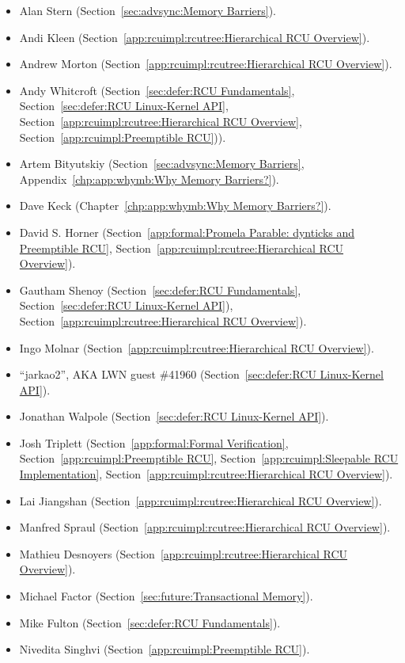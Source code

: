 \begin{itemize}
\item	Alan Stern (Section~\ref{sec:advsync:Memory Barriers}).
\item	Andi Kleen (Section~\ref{app:rcuimpl:rcutree:Hierarchical RCU Overview}).
\item	Andrew Morton (Section~\ref{app:rcuimpl:rcutree:Hierarchical RCU Overview}).
\item	Andy Whitcroft (Section~\ref{sec:defer:RCU Fundamentals},
	Section~\ref{sec:defer:RCU Linux-Kernel API},
	Section~\ref{app:rcuimpl:rcutree:Hierarchical RCU Overview},
	Section~\ref{app:rcuimpl:Preemptible RCU})).
\item	Artem Bityutskiy (Section~\ref{sec:advsync:Memory Barriers},
	Appendix~\ref{chp:app:whymb:Why Memory Barriers?}).
\item	Dave Keck (Chapter~\ref{chp:app:whymb:Why Memory Barriers?}).
\item	David S. Horner
	(Section~\ref{app:formal:Promela Parable: dynticks and Preemptible RCU},
	Section~\ref{app:rcuimpl:rcutree:Hierarchical RCU Overview}).
\item	Gautham Shenoy (Section~\ref{sec:defer:RCU Fundamentals},
	Section~\ref{sec:defer:RCU Linux-Kernel API}),
	Section~\ref{app:rcuimpl:rcutree:Hierarchical RCU Overview}).
\item	Ingo Molnar (Section~\ref{app:rcuimpl:rcutree:Hierarchical RCU Overview}).
\item	``jarkao2'', AKA LWN guest \#41960 (Section~\ref{sec:defer:RCU Linux-Kernel API}).
\item	Jonathan Walpole (Section~\ref{sec:defer:RCU Linux-Kernel API}).
\item	Josh Triplett
	(Section~\ref{app:formal:Formal Verification},
	Section~\ref{app:rcuimpl:Preemptible RCU},
	Section~\ref{app:rcuimpl:Sleepable RCU Implementation},
	Section~\ref{app:rcuimpl:rcutree:Hierarchical RCU Overview}).
\item	Lai Jiangshan (Section~\ref{app:rcuimpl:rcutree:Hierarchical RCU Overview}).
\item	Manfred Spraul (Section~\ref{app:rcuimpl:rcutree:Hierarchical RCU Overview}).
\item	Mathieu Desnoyers (Section~\ref{app:rcuimpl:rcutree:Hierarchical RCU Overview}).
\item	Michael Factor (Section~\ref{sec:future:Transactional Memory}).
\item	Mike Fulton (Section~\ref{sec:defer:RCU Fundamentals}).
\item	Nivedita Singhvi (Section~\ref{app:rcuimpl:Preemptible RCU}).

\end{itemize}
